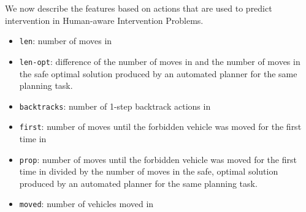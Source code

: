 We now describe the features based on actions that are used to predict intervention in Human-aware Intervention Problems.
\begin{itemize}
\item \texttt{len}: number of moves in \historyDef
\item \texttt{len-opt}: difference of the number of moves in \historyDef and the number of moves in the safe optimal solution produced by an automated planner for the same planning task.
\item \texttt{backtracks}: number of 1-step backtrack actions in \historyDef
\item \texttt{first}: number of moves until the forbidden vehicle was moved for the first time in \historyDef
\item \texttt{prop}: number of moves until the forbidden vehicle was moved for the first time in \historyDef divided by the number of moves in the safe, optimal solution produced by an automated planner for the same planning task.
\item \texttt{moved}: number of vehicles moved in \historyDef
\end{itemize}


